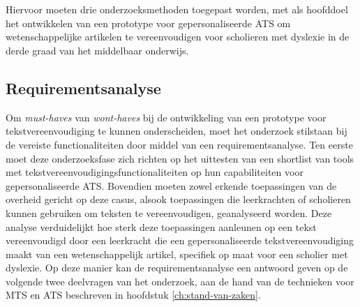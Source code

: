 
\chapter{}%
\label{ch:methodologie}



Hiervoor moeten drie onderzoeksmethoden toegepast worden, met als hoofddoel het ontwikkelen van een prototype voor gepersonaliseerde ATS om wetenschappelijke artikelen te vereenvoudigen voor scholieren met dyslexie in de derde graad van het middelbaar onderwijs.

\section{Requirementsanalyse}
\label{sec:requirementsanalyse}

Om \textit{must-haves} van \textit{wont-haves} bij de ontwikkeling van een prototype voor tekstvereenvoudiging te kunnen onderscheiden, moet het onderzoek stilstaan bij de vereiste functionaliteiten door middel van een requirementsanalyse. Ten eerste moet deze onderzoeksfase zich richten op het uittesten van een shortlist van tools met tekstvereenvoudigingsfunctionaliteiten op hun capabiliteiten voor gepersonaliseerde ATS. Bovendien moeten zowel erkende toepassingen van de overheid gericht op deze casus, alsook toepassingen die leerkrachten of scholieren kunnen gebruiken om teksten te vereenvoudigen, geanalyseerd worden. Deze analyse verduidelijkt hoe sterk deze toepassingen aanleunen op een tekst vereenvoudigd door een leerkracht die een gepersonaliseerde tekstvereenvoudiging maakt van een wetenschappelijk artikel, specifiek op maat voor een scholier met dyslexie. Op deze manier kan de requirementsanalyse een antwoord geven op de volgende twee deelvragen van het onderzoek, aan de hand van de technieken voor MTS en ATS beschreven in hoofdstuk \ref{ch:stand-van-zaken}.

